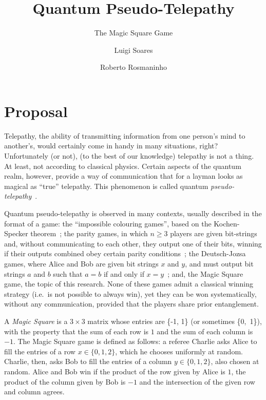 \documentclass{llncs}
\begin{document}
\title{Quantum Pseudo-Telepathy}
\subtitle{The Magic Square Game}

\author{Luigi Soares \and Roberto Rosmaninho}

\maketitle

\section*{Proposal}
\label{sec:prop}

Telepathy, the ability of transmitting information from one person's
mind to another's, would certainly come in handy in many situations,
right? Unfortunately (or not), (to the best of our knowledge)
telepathy is not a thing. At least, not according to classical
physics. Certain aspects of the quantum realm, however, provide a way
of communication that for a layman looks as magical as ``true''
telepathy. This phenomenon is called quantum
\emph{pseudo-telepathy}~\cite{brassard:2005}.

Quantum pseudo-telepathy is observed in many contexts, usually
described in the format of a game: the ``impossible colouring games'',
based on the Kochen-Specker theorem~\cite{brassard:2005, Kochen1975}; the
parity games, in which \(n \geq 3\) players are given bit-strings and,
without communicating to each other, they output one of their bits,
winning if their outputs combined obey certain parity
conditions~\cite{brassard:2005, Mermin1990}; the Deutsch-Jozsa games, where
Alice and Bob are given bit strings \(x\) and \(y\), and must output
bit strings \(a\) and \(b\) such that \(a = b\) if and only if
\(x = y\)~\cite{brassard:2005, Brassard_1999}; and, the Magic Square game, the
topic of this research\cite{brassard:2005, Mermin1990}. None of these games
admit a classical winning strategy (i.e.\ is not possible to always
win), yet they can be won systematically, without any communication,
provided that the players share prior
entanglement\cite{brassard:2005}.

A \emph{Magic Square} is a \(3 \times 3\) matrix whose entries are
\{-1, 1\} (or sometimes \{0,~1\}), with the property that the sum of
each row is \(1\) and the sum of each column is \(-1\). The Magic
Square game is defined as follows: a referee Charlie asks Alice to
fill the entries of a row \(x \in \{0, 1, 2\}\), which he chooses
uniformly at random. Charlie, then, asks Bob to fill the entries of a
column \(y \in \{0, 1, 2\}\), also chosen at random. Alice and Bob win
if the product of the row given by Alice is \(1\), the product of the
column given by Bob is \(-1\) and the intersection of the given row
and column agrees.
\end{document}

